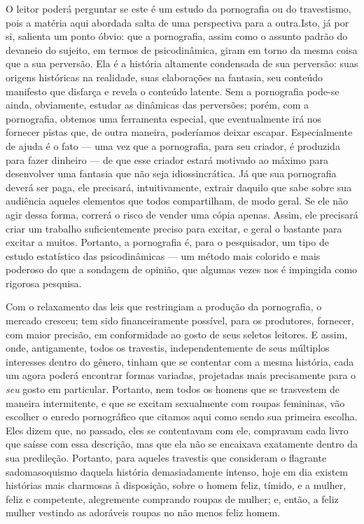 O leitor poderá perguntar se este é um estudo da pornografia ou do
travestismo,\idxpornoinst{} pois a matéria aqui abordada salta de uma perspectiva para
a outra.\idxpornoplat[|(] Isto, já por si, salienta um ponto óbvio: que a pornografia,
assim como o assunto padrão do devaneio do sujeito, em termos de
psicodinâmica, giram em torno da mesma coisa que a sua perversão. Ela é
a história altamente condensada de sua perversão: suas origens
históricas na realidade, suas elaborações na fantasia, seu conteúdo
manifesto que disfarça e revela o conteúdo latente. Sem a pornografia
pode-se ainda, obviamente, estudar as dinâmicas das perversões; porém,
com a pornografia, obtemos uma ferramenta especial, que eventualmente
irá nos fornecer pistas que, de outra maneira, poderíamos deixar
escapar. Especialmente de ajuda é o fato --- uma vez que a
pornografia, para seu criador, é produzida para fazer dinheiro --- de
que esse criador estará motivado ao máximo para desenvolver uma
fantasia que não seja idiossincrática. Já que sua pornografia deverá
ser paga, ele precisará, intuitivamente, extrair daquilo que sabe sobre
sua audiência aqueles elementos que todos compartilham, de modo geral.
Se ele não agir dessa forma, correrá o risco de vender uma cópia
apenas. Assim, ele precisará criar um trabalho suficientemente preciso
para excitar, e geral o bastante para excitar a muitos. Portanto, a
pornografia é, para o pesquisador, um tipo de estudo estatístico das
psicodinâmicas --- um método mais colorido e mais poderoso do que a
sondagem de opinião, que algumas vezes nos é impingida como rigorosa
pesquisa.

Com o relaxamento das leis que restringiam a produção da
pornografia, o mercado cresceu; tem sido financeiramente possível, para
os produtores, fornecer, com maior precisão, em conformidade ao gosto
de seus seletos leitores. E assim, onde, antigamente, todos os
travestis, independentemente de seus múltiplos interesses dentro do
gênero, tinham que se contentar com a mesma história, cada um agora
poderá encontrar formas variadas, projetadas mais precisamente para o
\textit{seu} gosto em particular. Portanto, nem todos os homens que se
trasvestem de maneira intermitente, e que se excitam sexualmente com
roupas femininas, vão escolher o enredo pornográfico que citamos aqui
como sendo sua primeira escolha. Eles dizem que, no passado, eles se
contentavam com ele, compravam cada livro que saísse com essa
descrição, mas que ela não se encaixava exatamente dentro da sua
predileção. Portanto, para aqueles travestis que consideram o flagrante
sadomasoquismo\idxpornosadi{} daquela história\idxsadiporn{} demasiadamente intenso, hoje em dia
existem histórias mais charmosas à disposição, sobre o homem feliz,
tímido, e a mulher, feliz e competente, alegremente comprando roupas de
mulher; e, então, a feliz mulher vestindo as adoráveis roupas no não
menos feliz homem.

